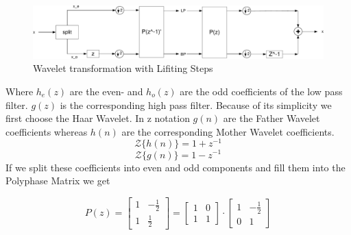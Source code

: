 \begin{refsection}
\begin{figure}
	\centering
	\includegraphics[width=\textwidth]{images/lifting_step_wavelet.pdf}
	\caption{Wavelet transformation with Lifiting Steps \label{fpga:lstp_wavelet}}
\end{figure}
Where $h_e(z)$ are the even- and $h_o(z)$ are the odd coefficients of the low pass filter.
$g(z)$ is the corresponding high pass filter. 
Because of its simplicity we first choose the Haar Wavelet.
In z notation $g(n)$ are the Father Wavelet coefficients whereas $h(n)$ are the corresponding Mother Wavelet coefficients. 
\begin{equation}
{\mathcal {Z}} \{h(n)\} = 1 + z^{-1}
\end{equation}
\begin{equation}
{\mathcal {Z}} \{g(n)\} = 1 - z^{-1}
\end{equation}
If we split these coefficients into even and odd components and fill them into the Polyphase Matrix we get 

\begin{equation*}
P(z) =
\begin{bmatrix}
1 & -\frac{1}{2} \\
1 & \frac{1}{2}
\end{bmatrix}
 = 
 \begin{bmatrix}
 1 & 0 \\
 1 & 1
 \end{bmatrix}
 \cdot
 \begin{bmatrix}
 1 & -\frac{1}{2} \\
 0 & 1
 \end{bmatrix}
\end{equation*}


\end{refsection}
